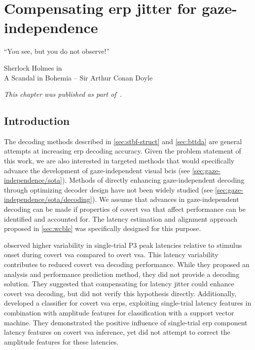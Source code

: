 \chapter{Compensating \acs{erp} jitter for gaze-independence}%
\label{sec:covert-align}
\epigraph{``You see, but you do not observe!''}{Sherlock Holmes in  \\ A
Scandal in Bohemia -- Sir Arthur Conan Doyle}
\noindent\emph{This chapter was published as part of~\textcite{VanDenKerchove2024}.}

\section{Introduction}

The decoding methods described in \cref{sec:stbf-struct} and
\cref{sec:bttda} are general attempts at increasing \ac{erp} decoding accuracy.
Given the problem statement of this work, we are also interested in targeted
methods that would specifically advance the development of gaze-independent
visual \acp{bci} (see \cref{sec:gaze-independence/sota}).
Methods of directly enhancing gaze-independent decoding through optimizing
decoder design have not been widely studied (see
\cref{sec:gaze-independence/sota/decoding}).
We assume that advances in gaze-independent decoding can be made if properties
of covert \ac{vsa} that affect performance can be identified and accounted for.
The latency estimation and alignment approach proposed in \cref{sec:wcble}
was specifically designed for this purpose.

\textcite{Arico2014} observed higher variability in single-trial P3 peak
latencies relative to stimulus onset during covert \ac{vsa} compared to overt
\ac{vsa}.
This latency variability contributes to reduced covert \ac{vsa} decoding performance.
While they proposed an analysis and performance prediction method, they did not provide a
decoding solution.
They suggested that compensating for latency jitter could enhance covert \ac{vsa}
decoding, but did not verify this hypothesis directly.
Additionally, \textcite{Hardiansyah2020} developed a classifier for
covert \ac{vsa} \acp{erp}, exploiting single-trial latency features in combination with
amplitude features for classification with a support vector machine.
They demonstrated the positive influence of single-trial \ac{erp} component latency
features on covert \ac{vsa} inference, yet did not attempt to correct the amplitude
features for these latencies.

